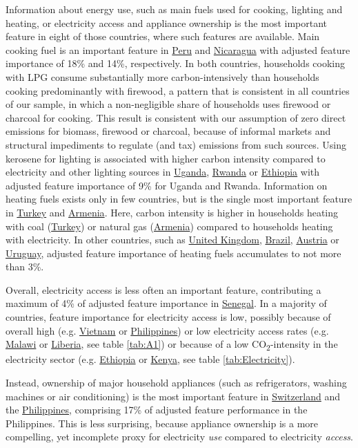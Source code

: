 \documentclass[12pt, a4paper]{article}
\begin{document}
Information about energy use, such as main fuels used for cooking, lighting and heating, or electricity access and appliance ownership is the most important feature in eight of those countries, where such features are available. Main cooking fuel is an important feature in \hyperref[fig:5b_PER]{Peru} and \hyperref[fig:5b_NIC]{Nicaragua} with adjusted feature importance of 18\% and 14\%, respectively. In both countries, households cooking with LPG consume substantially more carbon-intensively than households cooking predominantly with firewood, a pattern that is consistent in all countries of our sample, in which a non-negligible share of households uses firewood or charcoal for cooking. This result is consistent with our assumption of zero direct emissions for biomass, firewood or charcoal, because of informal markets and structural impediments to regulate (and tax) emissions from such sources. Using kerosene for lighting is associated with higher carbon intensity compared to electricity and other lighting sources in \hyperref[fig:5b_UGA]{Uganda}, \hyperref[fig:5b_RWA]{Rwanda} or \hyperref[fig:5b_ETH]{Ethiopia} with adjusted feature importance of 9\% for Uganda and Rwanda. Information on heating fuels exists only in few countries, but is the single most important feature in \hyperref[fig:5b_TUR]{Turkey} and \hyperref[fig:5b_ARM]{Armenia}. Here, carbon intensity is higher in households heating with coal (\hyperref[fig:5b_TUR]{Turkey}) or natural gas (\hyperref[fig:5b_ARM]{Armenia}) compared to households heating with electricity. In other countries, such as \hyperref[fig:5b_GBR]{United Kingdom}, \hyperref[fig:5b_BRA]{Brazil}, \hyperref[fig:5b_AUT]{Austria} or \hyperref[fig:5b_URY]{Uruguay}, adjusted feature importance of heating fuels accumulates to not more than 3\%.

Overall, electricity access is less often an important feature, contributing a maximum of 4\% of adjusted feature importance in \hyperref[fig:5b_SEN]{Senegal}. In a majority of countries, feature importance for electricity access is low, possibly because of overall high (e.g. \hyperref[fig:5b_VNM]{Vietnam} or \hyperref[fig:5b_PHL]{Philippines}) or low electricity access rates (e.g. \hyperref[fig:5b_MWI]{Malawi} or \hyperref[fig:5b_LBR]{Liberia}, see table \ref{tab:A1}) or because of a low CO\textsubscript{2}-intensity in the electricity sector (e.g. \hyperref[fig:5b_ETH]{Ethiopia} or \hyperref[fig:5b_KEN]{Kenya}, see table \ref{tab:Electricity}).

Instead, ownership of major household appliances (such as refrigerators, washing machines or air conditioning) is the most important feature in \hyperref[fig:5b_CHE]{Switzerland} and the \hyperref[fig:5b_PHL]{Philippines}, comprising 17\% of adjusted feature performance in the Philippines. This is less surprising, because appliance ownership is a more compelling, yet incomplete proxy for electricity \textit{use} compared to electricity \textit{access}.
\end{document}
